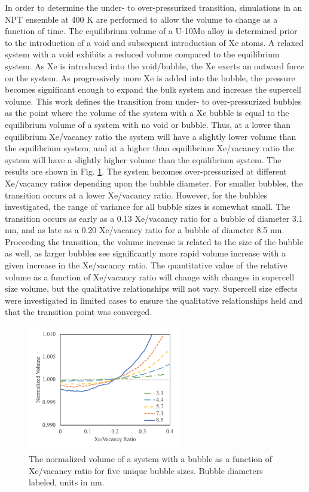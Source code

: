 \documentclass[review]{elsarticle}
\begin{document}
In order to determine the under- to over-pressurized transition, simulations in an NPT ensemble at 400 K are performed to allow the volume to change as a function of time. The equilibrium volume of a U-10Mo alloy is determined prior to the introduction of a void and subsequent introduction of Xe atoms. A relaxed system with a void exhibits a reduced volume compared to the equilibrium system. As Xe is introduced into the void/bubble, the Xe exerts an outward force on the system. As progressively more Xe is added into the bubble, the pressure becomes significant enough to expand the bulk system and increase the supercell volume. This work defines the transition from under- to over-pressurized bubbles as the point where the volume of the system with a Xe bubble is equal to the equilibrium volume of a system with no void or bubble. Thus, at a lower than equilibrium Xe/vacancy ratio the system will have a slightly lower volume than the equilibrium system, and at a higher than equilibrium Xe/vacancy ratio the system will have a slightly higher volume than the equilibrium system. The results are shown in Fig. \ref{fig:delV}. The system becomes over-pressurized at different Xe/vacancy ratios depending upon the bubble diameter. For smaller bubbles, the transition occurs at a lower Xe/vacancy ratio. However, for the bubbles investigated, the range of variance for all bubble sizes is somewhat small. The transition occurs as early as a 0.13 Xe/vacancy ratio for a bubble of diameter 3.1 nm, and as late as a 0.20 Xe/vacancy ratio for a bubble of diameter 8.5 nm. Proceeding the transition, the volume increase is related to the size of the bubble as well, as larger bubbles see significantly more rapid volume increase with a given increase in the Xe/vacancy ratio. The quantitative value of the relative volume as a function of Xe/vacancy ratio will change with changes in supercell size volume, but the qualitative relationships will not vary. Supercell size effects were investigated in limited cases to ensure the qualitative relationships held and that the transition point was converged. 

\begin{figure}[h]
 \centering
 \includegraphics[width=0.6\textwidth]{5_delV.png} 
 \caption{The normalized volume of a system with a bubble as a function of Xe/vacancy ratio for five unique bubble sizes. Bubble diameters labeled, units in nm.}
 \label{fig:delV}
\end{figure}
\end{document}
